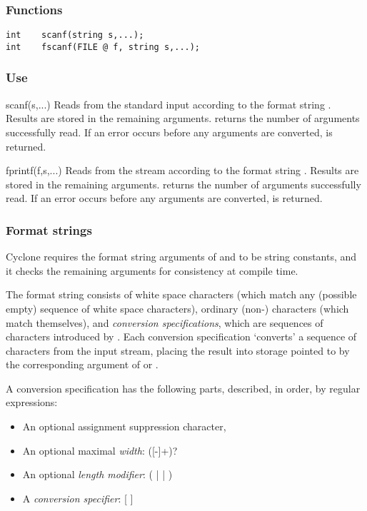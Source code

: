 \subsubsection*{Functions}
\begin{verbatim}
int    scanf(string s,...);
int    fscanf(FILE @ f, string s,...);
\end{verbatim}

\subsubsection*{Use}

\begin{defun}{scanf}{(s,...)}
Reads from the standard input according to the format string .
Results are stored in the remaining arguments.
 returns the number of arguments successfully read.
If an error occurs before any arguments are converted,  is
returned.
\end{defun}

\begin{defun}{fprintf}{(f,s,...)}
Reads from the stream  according to the format string .
Results are stored in the remaining arguments.
 returns the number of arguments successfully read.
If an error occurs before any arguments are converted,  is
returned.
\end{defun}

\subsubsection*{Format strings}

Cyclone requires the format string arguments of  and
 to be string constants, and it checks the remaining
arguments for consistency at compile time.

The format string consists of white space characters (which match any
(possible empty) sequence of white space characters), ordinary
(non-\code{\%}) characters (which match themselves), and \emph{conversion
specifications}, which are sequences of characters introduced by
\code{\%}.  Each conversion specification `converts' a sequence of
characters from the input stream, placing the result into storage
pointed to by the corresponding argument of  or
.

A conversion specification has the following parts, described, in order,
by regular expressions:
\begin{itemize}
\item An optional assignment suppression character, \code{*}
\item An optional maximal \emph{width}:
([-]+)?
\item An optional \emph{length modifier}:
( |  |  )
\item A \emph{conversion specifier}:
[               \code{\%}]
\end{itemize}


